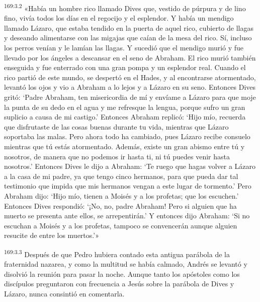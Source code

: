 \par 
\textsuperscript{169:3.2} «Había un hombre rico llamado Dives que, vestido de púrpura y de lino fino, vivía todos los días en el regocijo y el esplendor. Y había un mendigo llamado Lázaro, que estaba tendido en la puerta de aquel rico, cubierto de llagas y deseando alimentarse con las migajas que caían de la mesa del rico. Sí, incluso los perros venían y le lamían las llagas. Y sucedió que el mendigo murió y fue llevado por los ángeles a descansar en el seno de Abraham. El rico murió también enseguida y fue enterrado con una gran pompa y un esplendor real. Cuando el rico partió de este mundo, se despertó en el Hades, y al encontrarse atormentado, levantó los ojos y vio a Abraham a lo lejos y a Lázaro en su seno. Entonces Dives gritó: `Padre Abraham, ten misericordia de mí y envíame a Lázaro para que moje la punta de su dedo en el agua y me refresque la lengua, porque sufro un gran suplicio a causa de mi castigo.' Entonces Abraham replicó: `Hijo mío, recuerda que disfrutaste de las cosas buenas durante tu vida, mientras que Lázaro soportaba las malas. Pero ahora todo ha cambiado, pues Lázaro recibe consuelo mientras que tú estás atormentado. Además, existe un gran abismo entre tú y nosotros, de manera que no podemos ir hasta ti, ni tú puedes venir hasta nosotros.' Entonces Dives le dijo a Abraham: `Te ruego que hagas volver a Lázaro a la casa de mi padre, ya que tengo cinco hermanos, para que pueda dar tal testimonio que impida que mis hermanos vengan a este lugar de tormento.' Pero Abraham dijo: {}`Hijo mío, tienen a Moisés y a los profetas; que los escuchen.' Entonces Dives respondió: `¡No, no, padre Abraham! Pero si alguien que ha muerto se presenta ante ellos, se arrepentirán.' Y entonces dijo Abraham: `Si no escuchan a Moisés y a los profetas, tampoco se convencerán aunque alguien resucite de entre los muertos.'»

\par 
\textsuperscript{169:3.3} Después de que Pedro hubiera contado esta antigua parábola de la fraternidad nazarea, y como la multitud se había calmado, Andrés se levantó y disolvió la reunión para pasar la noche. Aunque tanto los apóstoles como los discípulos preguntaron con frecuencia a Jesús sobre la parábola de Dives y Lázaro, nunca consintió en comentarla.

